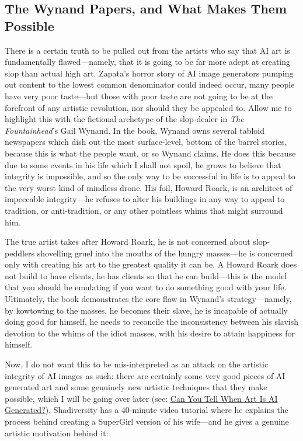 \documentclass[11pt]{article}
\begin{document}
\subsection*{The Wynand Papers, and What Makes Them Possible}
\label{sec:orgcfcb94b}
There is a certain truth to be pulled out from the artists who say that AI art is fundamentally flawed---namely, that it is going to be far more adept at creating slop than actual high art. Zapata's horror story of AI image generators pumping out content to the lowest common denominator could indeed occur, many people have very poor taste---but those with poor taste are not going to be at the forefront of any artistic revolution, nor should they be appealed to. Allow me to highlight this with the fictional archetype of the slop-dealer in \emph{The Fountainhead}'s Gail Wynand. In the book, Wynand owns several tabloid newspapers which dish out the most surface-level, bottom of the barrel stories, because this is what the people want, or so Wynand claims. He does this because due to some events in his life which I shall not spoil, he grows to believe that integrity is impossible, and so the only way to be successful in life is to appeal to the very worst kind of mindless drone. His foil, Howard Roark, is an architect of impeccable integrity---he refuses to alter his buildings in any way to appeal to tradition, or anti-tradition, or any other pointless whims that might surround him.

The true artist takes after Howard Roark, he is not concerned about slop-peddlers shovelling gruel into the mouths of the hungry masses---he is concerned only with creating his art to the greatest quality it can be. A Howard Roark does not build to have clients, he has clients so that he can build---this is the model that you should be emulating if you want to do something good with your life. Ultimately, the book demonstrates the core flaw in Wynand's strategy---namely, by kowtowing to the masses, he becomes their slave, he is incapable of actually doing good for himself, he needs to reconcile the inconsistency between his slavish devotion to the whims of the idiot masses, with his desire to attain happiness for himself.

Now, I do not want this to be mis-interpreted as an attack on the artistic integrity of AI images as such: there are certainly some very good pieces of AI generated art and some genuinely new artistic techniques that they make possible, which I will be going over later (see: \hyperref[sec:org07198dd]{Can You Tell When Art Is AI Generated?}). Shadiversity has a 40-minute video tutorial where he explains the process behind creating a SuperGirl version of his wife---and he gives a genuine artistic motivation behind it:
\end{document}
